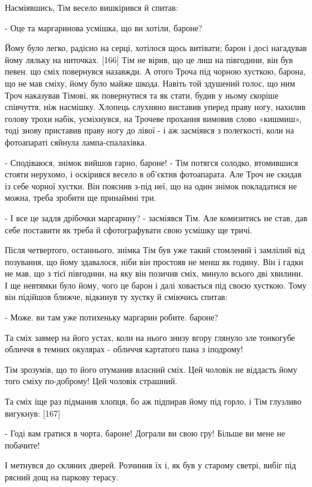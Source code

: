 Насміявшись, Тім весело вишкірився й спитав:

- Оце та маргаринова усмішка, що ви хотіли, бароне?

Йому було легко, радісно на серці, хотілося щось витівати; барон і досі нагадував йому ляльку на ниточках. [166] Тім не вірив, що це лиш на півгодини, він був певен. що сміх повернувся назавжди. А отого Троча під чорною хусткою, барона, що не мав сміху, йому було майже шкода. Навіть той здушений голос, що ним Троч наказував Тімові, як повернутися та як стати, будив у ньому скоріше співчуття, ніж насмішку. Хлопець слухняно виставив уперед праву ногу, нахилив голову трохи набік, усміхнувся, на Трочеве прохання вимовив слово «кишмиш», тоді знову приставив праву ногу до лівої - і аж засміявся з полегкості, коли на фотоапараті сяйнула лампа-спалахівка.

- Сподіваюся, знімок вийшов гарно, бароне! - Тім потягся солодко, втомившися стояти нерухомо, і оскірився весело в об'єктив фотоапарата. Але Троч не скидав із себе чорної хустки. Він пояснив з-під неї, що на один знімок покладатися не можна, треба зробити ще принаймні три.

- І все це задля дрібочки маргарину? - засміявся Тім. Але комизитись не став, дав себе поставити як треба й сфотографувати свою усмішку ще тричі.

Після четвертого, останнього, знімка Тім був уже такий стомлений і замлілий від позування, що йому здавалося, ніби він простояв не менш як годину. Він і гадки не мав, що з тієї півгодини, на яку він позичив сміх, минуло всього дві хвилини. І ще невтямки було йому, чого це барон і далі ховається під своєю хусткою. Тому він підійшов ближче, відкинув ту хустку й сміючись спитав:

- Може. ви там уже потихеньку маргарин робите. бароне?

Та сміх завмер на його устах, коли на нього знизу вгору глянуло зле тонкогубе обличчя в темних окулярах - обличчя картатого пана з іподрому!

Тім зрозумів, що то його отуманив власний сміх. Цей чоловік не віддасть йому того сміху по-доброму! Цей чоловік страшний.

Та сміх іще раз підманив хлопця, бо аж підпирав йому під горло, і Тім глузливо вигукнув: [167]

- Годі вам гратися в чорта, бароне! Дограли ви свою гру! Більше ви мене не побачите!

І метнувся до скляних дверей. Розчинив їх і, як був у старому светрі, вибіг під рясний дощ на паркову терасу.

